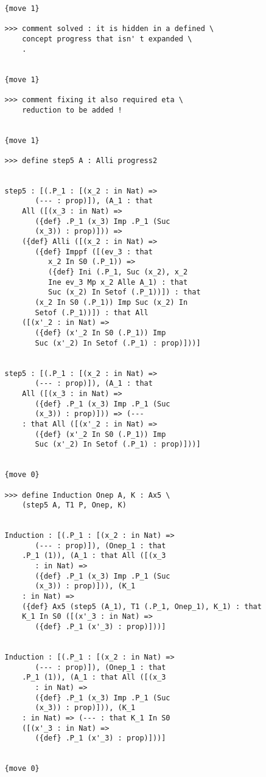 \documentclass{article}
\begin{document}
\begin{verbatim}
   {move 1}

   >>> comment solved : it is hidden in a defined \
       concept progress that isn' t expanded \
       .


   {move 1}

   >>> comment fixing it also required eta \
       reduction to be added !


   {move 1}

   >>> define step5 A : Alli progress2


   step5 : [(.P_1 : [(x_2 : in Nat) => 
          (--- : prop)]), (A_1 : that 
       All ([(x_3 : in Nat) => 
          ({def} .P_1 (x_3) Imp .P_1 (Suc 
          (x_3)) : prop)])) => 
       ({def} Alli ([(x_2 : in Nat) => 
          ({def} Imppf ([(ev_3 : that 
             x_2 In S0 (.P_1)) => 
             ({def} Ini (.P_1, Suc (x_2), x_2 
             Ine ev_3 Mp x_2 Alle A_1) : that 
             Suc (x_2) In Setof (.P_1))]) : that 
          (x_2 In S0 (.P_1)) Imp Suc (x_2) In 
          Setof (.P_1))]) : that All 
       ([(x'_2 : in Nat) => 
          ({def} (x'_2 In S0 (.P_1)) Imp 
          Suc (x'_2) In Setof (.P_1) : prop)]))]


   step5 : [(.P_1 : [(x_2 : in Nat) => 
          (--- : prop)]), (A_1 : that 
       All ([(x_3 : in Nat) => 
          ({def} .P_1 (x_3) Imp .P_1 (Suc 
          (x_3)) : prop)])) => (--- 
       : that All ([(x'_2 : in Nat) => 
          ({def} (x'_2 In S0 (.P_1)) Imp 
          Suc (x'_2) In Setof (.P_1) : prop)]))]


   {move 0}

   >>> define Induction Onep A, K : Ax5 \
       (step5 A, T1 P, Onep, K)


   Induction : [(.P_1 : [(x_2 : in Nat) => 
          (--- : prop)]), (Onep_1 : that 
       .P_1 (1)), (A_1 : that All ([(x_3 
          : in Nat) => 
          ({def} .P_1 (x_3) Imp .P_1 (Suc 
          (x_3)) : prop)])), (K_1 
       : in Nat) => 
       ({def} Ax5 (step5 (A_1), T1 (.P_1, Onep_1), K_1) : that 
       K_1 In S0 ([(x'_3 : in Nat) => 
          ({def} .P_1 (x'_3) : prop)]))]


   Induction : [(.P_1 : [(x_2 : in Nat) => 
          (--- : prop)]), (Onep_1 : that 
       .P_1 (1)), (A_1 : that All ([(x_3 
          : in Nat) => 
          ({def} .P_1 (x_3) Imp .P_1 (Suc 
          (x_3)) : prop)])), (K_1 
       : in Nat) => (--- : that K_1 In S0 
       ([(x'_3 : in Nat) => 
          ({def} .P_1 (x'_3) : prop)]))]


   {move 0}


\end{verbatim}
\end{document}
